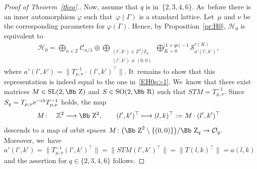 \documentclass[10pt,a4paper]{amsart}
\newcommand\RR{{\mbox{\Bb R}}}
\newcommand\ZZ{{\mbox{\Bb Z}}}
\newcommand\Z{{\mathbb Z}}
\newcommand\cC{{\mathcal C}}
\newcommand\cH{{\mathcal H}}
\newcommand\cO{{\mathcal O}}
\newcommand\ph{\varphi}
\newcommand{\SL}{\mathop{{\rm SL}}}
\newcommand{\SO}{\mathop{{\rm SO}}}
\numberwithin{equation}{section}
\begin{document}
\begin{proof}[Proof of Theorem~\ref{theo}.]
Now, assume that $q$ is in~$\{2,3,4,6\}$. As~before there is an inner automorphism $\ph$ such that~$\varphi(\Gamma)$ is a standard lattice. Let~$\mu$ and $\nu$ be the corresponding parameters for $\ph(\Gamma)$.
Hence, by Proposition~\ref{pr:H0}, $\cH_0$ is equivalent to
\begin{gather*}
\cH_0=\bigoplus_{n\in \Z} \cC_{n/\lambda} \oplus \bigoplus _{\substack{(l',k')\in\Z^2/\Z_q\\(l',k')\not=(0,0)}} \bigoplus_{K=0}^{|1+q\kappa|-1} {\mathcal S}_{a'(l',k')}^{\tau(K)},
\end{gather*}
 where $a'(l',k')=\big\|T_{\mu,\nu}^{-1}\cdot(l',k')^\top\big\|$. It~remains to show that this representation is indeed equal to the one in~\eqref{EH0q>1}. We~know that there exist matrices $M\in\SL(2,\ZZ)$ and $S\in\SO(2,\RR)$ such that $STM=T_{\mu,\nu}^{-1}$.
Since $S_q=T_{\mu,\nu}{\rm e}^{-{\rm i}\lambda}T_{\mu,\nu}^{-1}$ holds, the map
\begin{gather*}
M\colon\quad \Z^2\longrightarrow \ZZ^2,\qquad (l',k')^\top\longmapsto (l,k)^\top:=M\cdot (l',k')^\top
\end{gather*} descends to a map of orbit spaces $M\colon \big(\ZZ^2\setminus\{(0,0)\}\big)/\ZZ_q\rightarrow \cO_q$.
Moreover, we~have $a'(l',k')=\big\|T_{\mu,\nu}^{-1}(l',k')^\top\big\|=\big\|STM(l',k')^\top\big\|=\big\|T(l,k)^\top\big\|=a(l,k)$ and the assertion for $q\in\{2,3,4,6\}$ follows.
\end{proof}


\end{document}

